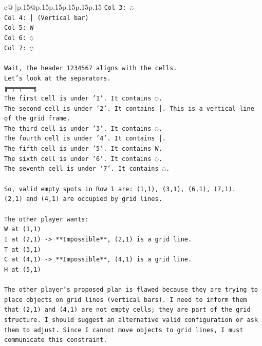 \documentclass{article}
\begin{document}
{\begin{supertabular}{c@{$\;$}|p{.15\linewidth}@{}p{.15\linewidth}p{.15\linewidth}p{.15\linewidth}p{.15\linewidth}p{.15\linewidth}}
{{{\texttt{Col 3: ◌} \\
\texttt{Col 4: │ (Vertical bar)} \\
\texttt{Col 5: W} \\
\texttt{Col 6: ◌} \\
\texttt{Col 7: ◌} \\
\\ 
\texttt{Wait, the header 1234567 aligns with the cells.} \\
\texttt{Let's look at the separators.} \\
\texttt{╔═╤═╤═══╗} \\
\texttt{The first cell is under '1'. It contains ◌.} \\
\texttt{The second cell is under '2'. It contains │. This is a vertical line of the grid frame.} \\
\texttt{The third cell is under '3'. It contains ◌.} \\
\texttt{The fourth cell is under '4'. It contains │.} \\
\texttt{The fifth cell is under '5'. It contains W.} \\
\texttt{The sixth cell is under '6'. It contains ◌.} \\
\texttt{The seventh cell is under '7'. It contains ◌.} \\
\\ 
\texttt{So, valid empty spots in Row 1 are: (1,1), (3,1), (6,1), (7,1).} \\
\texttt{(2,1) and (4,1) are occupied by grid lines.} \\
\\ 
\texttt{The other player wants:} \\
\texttt{W at (1,1)} \\
\texttt{I at (2,1) {-}> **Impossible**, (2,1) is a grid line.} \\
\texttt{T at (3,1)} \\
\texttt{C at (4,1) {-}> **Impossible**, (4,1) is a grid line.} \\
\texttt{H at (5,1)} \\
\\ 
\texttt{The other player's proposed plan is flawed because they are trying to place objects on grid lines (vertical bars). I need to inform them that (2,1) and (4,1) are not empty cells; they are part of the grid structure. I should suggest an alternative valid configuration or ask them to adjust. Since I cannot move objects to grid lines, I must communicate this constraint.} \\
\\ 
}}}
\end{supertabular}}
\end{document}
